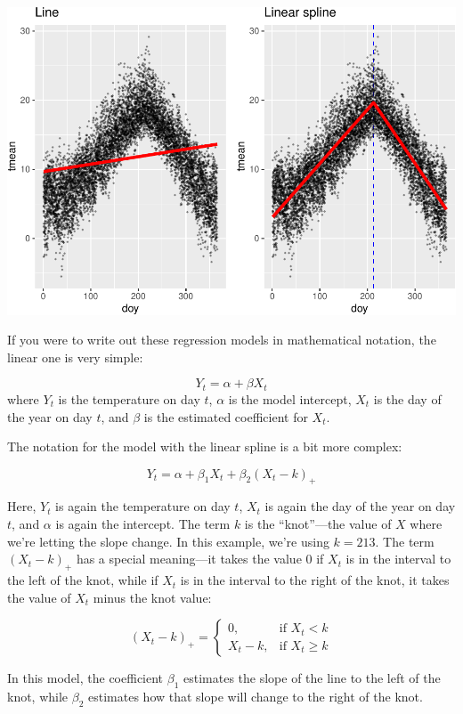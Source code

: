 \documentclass[
]{book}
\begin{document}
\includegraphics{adv_epi_analysis_files/figure-latex/unnamed-chunk-42-1.pdf}

If you were to write out these regression models in mathematical notation, the
linear one is very simple:

\[
Y_t = \alpha + \beta X_t
\]
where \(Y_t\) is the temperature on day \(t\), \(\alpha\) is the model intercept,
\(X_t\) is the day of the year on day \(t\), and \(\beta\) is the estimated coefficient
for \(X_t\).

The notation for the model with the linear spline is a bit more complex:

\[
Y_t = \alpha + \beta_1 X_t + \beta_2 (X_t - k)_+
\]

Here, \(Y_t\) is again the temperature on day \(t\), \(X_t\) is again the day of the year
on day \(t\), and \(\alpha\) is again the intercept. The term \(k\) is the ``knot''---the
value of \(X\) where we're letting the slope change. In this example, we're using
\(k = 213\). The term \((X_t - k)_+\) has a special meaning---it takes the value
0 if \(X_t\) is in the interval to the left of the knot, while if \(X_t\) is in the
interval to the right of the knot, it takes the value of \(X_t\) minus the knot
value:

\[ 
(X_t - k)_+ =
\begin{cases}
0, & \mbox{if } X_t < k \\
X_t - k, & \mbox{if } X_t \ge k 
\end{cases}
\]

In this model, the coefficient \(\beta_1\) estimates the slope of the line to the
left of the knot, while \(\beta_2\) estimates how that slope will change to the
right of the knot.
\end{document}
